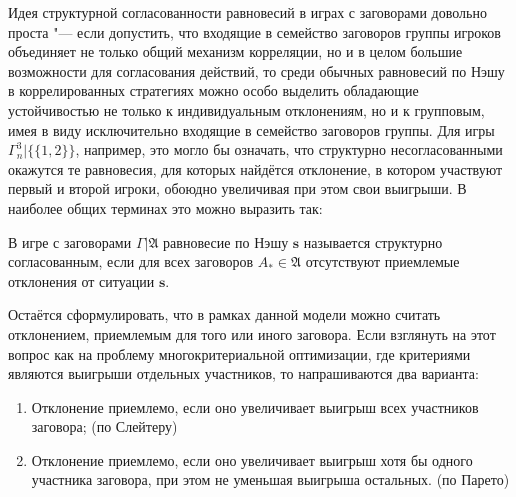 Идея структурной согласованности равновесий в играх с заговорами довольно проста "--- если допустить, что входящие в семейство заговоров группы игроков объединяет не только общий механизм корреляции, но и в целом большие возможности для согласования действий, то среди обычных равновесий по Нэшу в коррелированных стратегиях можно особо выделить обладающие устойчивостью не только к индивидуальным отклонениям, но и к групповым, имея в виду исключительно входящие в семейство заговоров группы. Для игры $\Gamma^3_n | \{\{1,2\}\}$, например, это могло бы означать, что структурно несогласованными окажутся те равновесия, для которых найдётся отклонение, в котором участвуют первый и второй игроки, обоюдно увеличивая при этом свои выигрыши. В наиболее общих терминах это можно выразить так:
\begin{definition}
	В игре с заговорами $\Gamma | \mathfrak{A}$ равновесие по Нэшу $\mathbf{s}$ называется структурно согласованным, если для всех заговоров $A_* \in \mathfrak{A}$ отсутствуют приемлемые отклонения от ситуации $\mathbf{s}$.
\end{definition}

Остаётся сформулировать, что в рамках данной модели можно считать отклонением, приемлемым для того или иного заговора. Если взглянуть на этот вопрос как на проблему многокритериальной оптимизации, где критериями являются выигрыши отдельных участников, то напрашиваются два варианта:
\begin{enumerate}
	\item Отклонение приемлемо, если оно увеличивает выигрыш всех участников заговора; (по Слейтеру)
	\item Отклонение приемлемо, если оно увеличивает выигрыш хотя бы одного участника заговора, при этом не уменьшая выигрыша остальных. (по Парето)
\end{enumerate}

